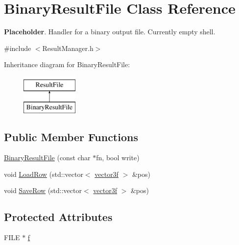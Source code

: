 \hypertarget{class_binary_result_file}{}\section{Binary\+Result\+File Class Reference}
\label{class_binary_result_file}


{\bfseries Placeholder}. Handler for a binary output file. Currently empty shell.  




{\ttfamily \#include $<$Result\+Manager.\+h$>$}

Inheritance diagram for Binary\+Result\+File\+:\begin{figure}[H]
\begin{center}
\leavevmode
\includegraphics[height=2.000000cm]{class_binary_result_file}
\end{center}
\end{figure}
\subsection*{Public Member Functions}
\begin{DoxyCompactItemize}
\item 
\hyperlink{class_binary_result_file_a1fe910a577f64347ab32b38b17ec1b0e}{Binary\+Result\+File} (const char $\ast$fn, bool write)
\item 
void \hyperlink{class_binary_result_file_aed703ab14e081fe4adfea853031191bc}{Load\+Row} (std\+::vector$<$ \hyperlink{std__incl_8h_a2feaef1d85a74bd5cf80df91b1a9a914}{vector3f} $>$ \&pos)
\item 
void \hyperlink{class_binary_result_file_a485208fbf3ae20eb68f0341ec6632a1f}{Save\+Row} (std\+::vector$<$ \hyperlink{std__incl_8h_a2feaef1d85a74bd5cf80df91b1a9a914}{vector3f} $>$ \&pos)
\end{DoxyCompactItemize}
\subsection*{Protected Attributes}
\begin{DoxyCompactItemize}
\item 
F\+I\+LE $\ast$ \hyperlink{class_binary_result_file_a52c8b61cea0019e62f0e6c3530c2937d}{f}
\end{DoxyCompactItemize}


